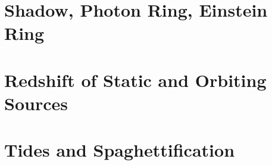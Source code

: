 \section{Shadow, Photon Ring, Einstein Ring}\label{sec:shadow-photon-ring-einstein-ring}

\section{Redshift of Static and Orbiting Sources}\label{sec:redshift-of-static-and-orbiting-sources}

\section{Tides and Spaghettification}\label{sec:tides-and-spaghettification}
